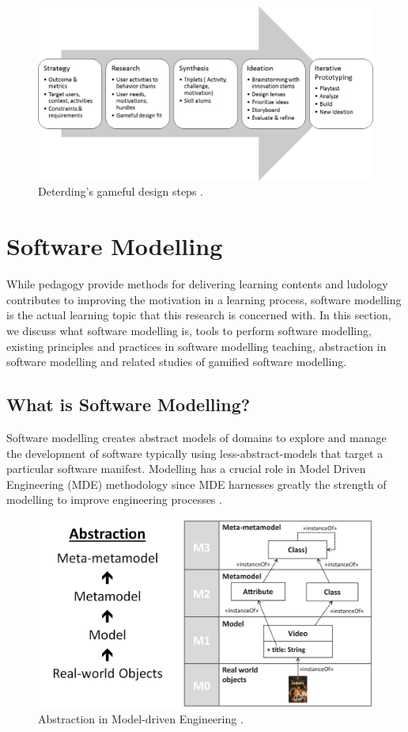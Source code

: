 \documentclass[12pt, a4paper]{report}
\begin{document}
{\begin{figure}[ht]
\centering
\includegraphics[width=12cm]{gameful-steps}
\caption{Deterding's gameful design steps \cite{deterding2015lens}.}
\label{fig:gameful-steps}
\end{figure}


\section{Software Modelling}
While pedagogy provide methods for delivering learning contents and ludology contributes to improving the motivation in a learning process, software modelling is the actual learning topic that this research is concerned with. In this section, we discuss what software modelling is, tools to perform software modelling, existing principles and practices in software modelling teaching, abstraction in software modelling and related studies of gamified software modelling.    

\subsection{What is Software Modelling?}
Software modelling creates abstract models of domains to explore and manage the development of software typically using less-abstract-models that target a particular software manifest. Modelling has a crucial role in Model Driven Engineering (MDE) methodology since MDE harnesses greatly the strength of modelling to improve engineering processes \cite{brambilla2012model}.  

\begin{figure}[!b]
\centering
\includegraphics[width=13cm]{abstraction}
\caption{Abstraction in Model-driven Engineering \cite{brambilla2012model}.}
\label{abstraction}
\end{figure}

}
\end{document}
